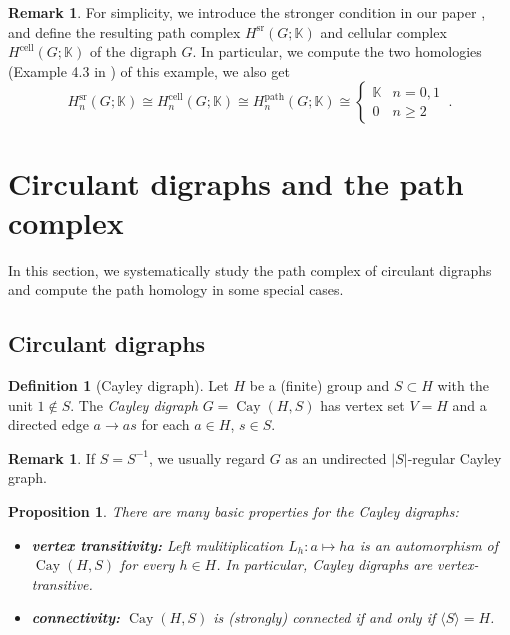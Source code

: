 \documentclass[11pt]{amsart}
\DeclareMathOperator{\sr}{sr}
\DeclareMathOperator{\cell}{cell}
\DeclareMathOperator{\Cay}{Cay}
\newcommand{\K}{\mathbb K}
\theoremstyle{plain}
\newtheorem{proposition}[theorem]{Proposition}
\theoremstyle{definition}
\newtheorem{definition}[theorem]{Definition}
\newtheorem{remark}[theorem]{Remark}
\numberwithin{equation}{section}
\begin{document}
\begin{remark}
For simplicity, we introduce the stronger condition in our paper \cite{TY1,TY2}, and define the resulting path complex $H^{\sr}(G;\K)$ and cellular complex $H^{\cell}(G;\K)$ of the digraph $G$. In particular, we compute the two homologies (Example 4.3 in \cite{TY2}) of this example, we also get
\[
H_n^{\sr}(G;\K)\cong H_n^{\cell}(G;\K)\cong H_n^{\mathrm{path}}(G;\K)\cong
\begin{cases}
    \K & n=0,1\\
    0 & n\geq2
\end{cases}~.
\]
\end{remark}





\bigskip
\section{Circulant digraphs and the path complex}
In this section, we systematically study the path complex of circulant digraphs and compute the path homology in some special cases.
\subsection{Circulant digraphs}\label{sub:circulant}

\begin{definition}[Cayley digraph]
Let $H$ be a (finite) group and $S\subset H$ with the unit $1\notin S$. The \emph{Cayley digraph} $G=\Cay(H,S)$ has vertex set $V=H$ and a directed edge $a\rightarrow as$ for each $a\in H$, $s\in S$.    
\end{definition}

\begin{remark}
If $S=S^{-1}$, we usually regard $G$ as an undirected $|S|$-regular Cayley graph.
\end{remark}

\begin{proposition}
There are many basic properties for the Cayley digraphs:
\begin{itemize}
    \item \textbf{vertex transitivity:} Left mulitiplication $L_h:a\mapsto ha$ is an automorphism of $\Cay(H,S)$ for every $h\in H$. In particular, Cayley digraphs are vertex-transitive.
    \item \textbf{connectivity:} $\Cay(H,S)$ is (strongly) connected if and only if $\langle S\rangle=H$.
\end{itemize}
\end{proposition}
\end{document}
